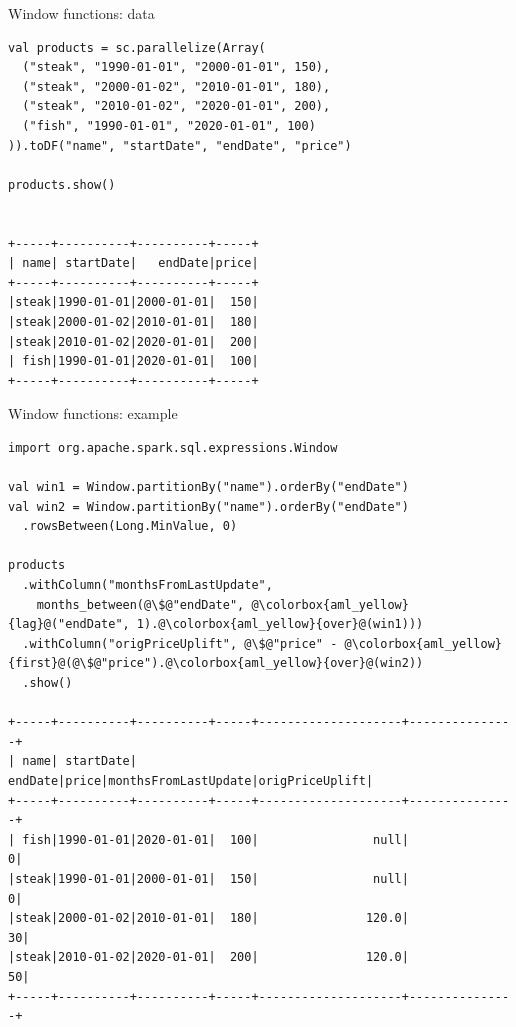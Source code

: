 \documentclass[unicode, notheorems]{beamer}
\begin{document}
\begin{frame}[fragile]{Window functions: data}

{\footnotesize
\begin{verbatim}
val products = sc.parallelize(Array(
  ("steak", "1990-01-01", "2000-01-01", 150),
  ("steak", "2000-01-02", "2010-01-01", 180),
  ("steak", "2010-01-02", "2020-01-01", 200),
  ("fish", "1990-01-01", "2020-01-01", 100)
)).toDF("name", "startDate", "endDate", "price")

products.show()


+-----+----------+----------+-----+
| name| startDate|   endDate|price|
+-----+----------+----------+-----+
|steak|1990-01-01|2000-01-01|  150|
|steak|2000-01-02|2010-01-01|  180|
|steak|2010-01-02|2020-01-01|  200|
| fish|1990-01-01|2020-01-01|  100|
+-----+----------+----------+-----+
\end{verbatim}
}
\end{frame}


\begin{frame}[fragile]{Window functions: example}

{\footnotesize
\begin{verbatim}
import org.apache.spark.sql.expressions.Window

val win1 = Window.partitionBy("name").orderBy("endDate")
val win2 = Window.partitionBy("name").orderBy("endDate")
  .rowsBetween(Long.MinValue, 0)

products
  .withColumn("monthsFromLastUpdate",
    months_between(@\$@"endDate", @\colorbox{aml_yellow}{lag}@("endDate", 1).@\colorbox{aml_yellow}{over}@(win1)))
  .withColumn("origPriceUplift", @\$@"price" - @\colorbox{aml_yellow}{first}@(@\$@"price").@\colorbox{aml_yellow}{over}@(win2))
  .show()

+-----+----------+----------+-----+--------------------+---------------+
| name| startDate|   endDate|price|monthsFromLastUpdate|origPriceUplift|
+-----+----------+----------+-----+--------------------+---------------+
| fish|1990-01-01|2020-01-01|  100|                null|              0|
|steak|1990-01-01|2000-01-01|  150|                null|              0|
|steak|2000-01-02|2010-01-01|  180|               120.0|             30|
|steak|2010-01-02|2020-01-01|  200|               120.0|             50|
+-----+----------+----------+-----+--------------------+---------------+
\end{verbatim}
}
\end{frame}
\end{document}
